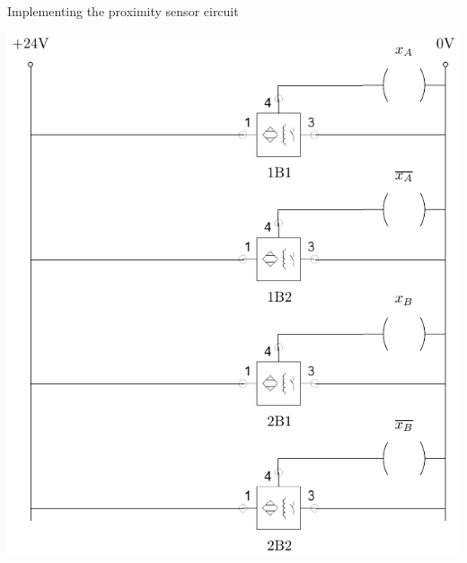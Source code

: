 \documentclass[presentation,aspectratio=1610]{beamer}
\begin{document}
\begin{frame}[label={sec:org44145e6}]{Implementing the proximity sensor circuit}
\begin{center}
\includegraphics[height=0.9\textheight]{sensor-circuit}
\end{center}
\end{frame}
\end{document}

